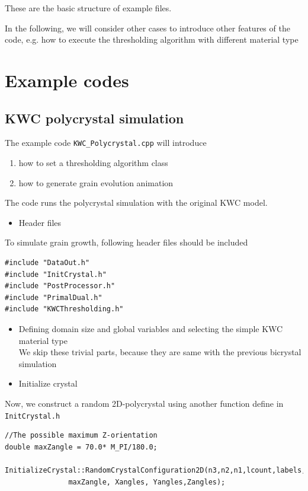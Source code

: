\documentclass[11pt]{article}
\begin{document}
These are the basic structure of example files. 

In the following, we will consider other cases to
introduce other features of the code, 
e.g. how to execute the thresholding algorithm with different material type

\section{Example codes}

\subsection{KWC polycrystal simulation}

The example code \texttt{KWC\_Polycrystal.cpp} will introduce
\begin{enumerate}
\item how to set a thresholding algorithm class
\item how to generate grain evolution animation 
\end{enumerate}
The code runs the polycrystal simulation with the original KWC model. 

\begin{itemize} \item Header files \end{itemize} 
To simulate grain growth, following header files should be included
\begin{tcolorbox}
\begin{lstlisting}[basicstyle=\footnotesize]
#include "DataOut.h"
#include "InitCrystal.h"
#include "PostProcessor.h"
#include "PrimalDual.h"
#include "KWCThresholding.h"
\end{lstlisting}
\end{tcolorbox}

\begin{itemize}
\item Defining domain size and global variables and 
selecting the simple KWC material type\\
We skip these trivial parts, 
because they are same with the previous bicrystal simulation 
\end{itemize}

\begin{itemize} \item Initialize crystal \end{itemize} 
Now, we construct a random 2D-polycrystal
using another function define in \texttt{InitCrystal.h}
\begin{tcolorbox}
\begin{lstlisting}[basicstyle=\footnotesize]
//The possible maximum Z-orientation
double maxZangle = 70.0* M_PI/180.0;

InitializeCrystal::RandomCrystalConfiguration2D(n3,n2,n1,lcount,labels, 
  			   maxZangle, Xangles, Yangles,Zangles);
\end{lstlisting}
\end{tcolorbox}
\end{document}
